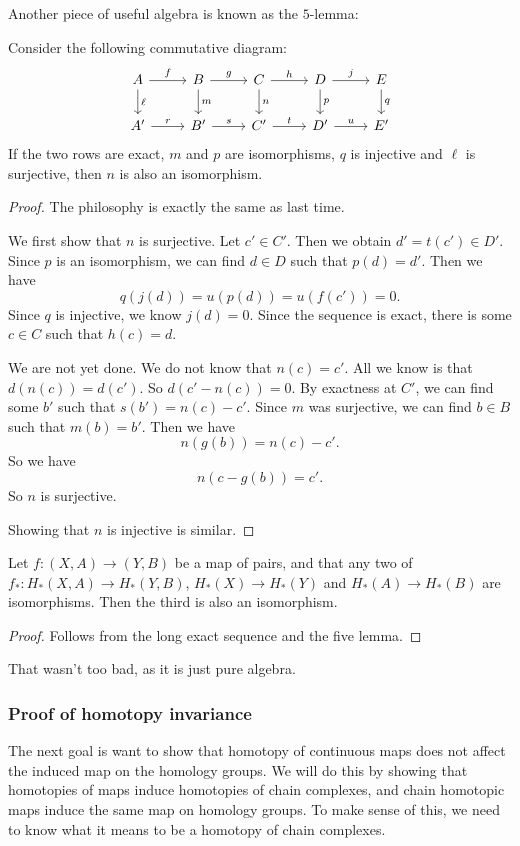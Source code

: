 \documentclass[a4paper]{article}
\theoremstyle{definition}
\begin{document}
Another piece of useful algebra is known as the $5$-lemma:
\begin{lemma}
  Consider the following commutative diagram:
  \[
    \begin{tikzcd}
      A \ar[r, "f"] \ar[d, "\ell"] & B \ar[r, "g"] \ar[d, "m"] & C \ar[r, "h"] \ar[d, "n"] & D \ar[r, "j"] \ar[d, "p"] & E \ar[d, "q"]\\
      A' \ar[r, "r"] & B' \ar[r, "s"] & C' \ar[r, "t"] & D' \ar[r, "u"] & E'
    \end{tikzcd}
  \]
  If the two rows are exact, $m$ and $p$ are isomorphisms, $q$ is injective and $\ell$ is surjective, then $n$ is also an isomorphism.
\end{lemma}

\begin{proof}
  The philosophy is exactly the same as last time.

  We first show that $n$ is surjective. Let $c' \in C'$. Then we obtain $d' = t(c') \in D'$. Since $p$ is an isomorphism, we can find $d \in D$ such that $p(d) = d'$. Then we have
  \[
    q(j(d)) = u(p(d)) = u(f(c')) = 0.
  \]
  Since $q$ is injective, we know $j(d) = 0$. Since the sequence is exact, there is some $c \in C$ such that $h(c) = d$.

  We are not yet done. We do not know that $n(c) = c'$. All we know is that $d(n(c)) = d(c')$. So $d(c' - n(c)) = 0$. By exactness at $C'$, we can find some $b'$ such that $s(b') = n(c) - c'$. Since $m$ was surjective, we can find $b \in B$ such that $m(b) = b'$. Then we have
  \[
    n(g(b)) = n(c) - c'.
  \]
  So we have
  \[
    n(c - g(b)) = c'.
  \]
  So $n$ is surjective.

  Showing that $n$ is injective is similar.
\end{proof}

\begin{cor}
  Let $f: (X, A) \to (Y, B)$ be a map of pairs, and that any two of $f_*: H_*(X, A) \to H_*(Y, B)$, $H_*(X) \to H_*(Y)$ and $H_*(A) \to H_*(B)$ are isomorphisms. Then the third is also an isomorphism.
\end{cor}

\begin{proof}
  Follows from the long exact sequence and the five lemma.
\end{proof}

That wasn't too bad, as it is just pure algebra.

\subsubsection*{Proof of homotopy invariance}
The next goal is want to show that homotopy of continuous maps does not affect the induced map on the homology groups. We will do this by showing that homotopies of maps induce homotopies of chain complexes, and chain homotopic maps induce the same map on homology groups. To make sense of this, we need to know what it means to be a homotopy of chain complexes.
\end{document}
